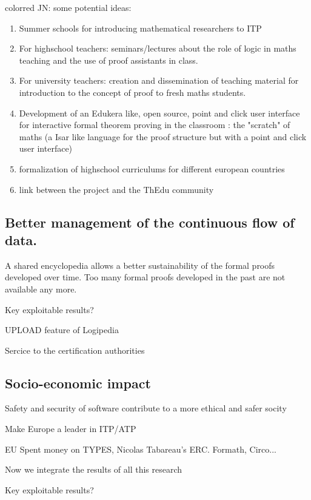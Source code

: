{color{red} JN:  some potential ideas:}
\begin{enumerate}
\item Summer schools for introducing mathematical researchers to ITP
\item For highschool teachers: seminars/lectures about  the role of logic in maths teaching and the use of proof assistants in class.
\item For university teachers: creation and dissemination of teaching material for introduction to the concept of proof to fresh maths students.   
\item Development of an Edukera like, open source, point and click user interface for interactive formal theorem proving in the classroom : the "scratch" of maths  (a Isar like language for the proof structure but with a point and click user interface)
\item formalization of  highschool curriculums for different european countries
\item link between the project and the ThEdu community
\end{enumerate}

\subsection{Better management of the continuous flow of data.}

A shared encyclopedia allows a better sustainability of the formal
proofs developed over time. Too many formal proofs developed in the
past are not available any more.

{\color{red} Key exploitable results?}

UPLOAD feature of Logipedia

Sercice to the certification authorities

\subsection{Socio-economic impact}

{\color{red} Safety and security of software contribute to a more ethical
  and safer socity}

Make Europe a leader in ITP/ATP

EU Spent money on TYPES, Nicolas Tabareau's ERC. Formath, Circo... 

Now we integrate the results of all this research

{\color{red} Key exploitable results?}


